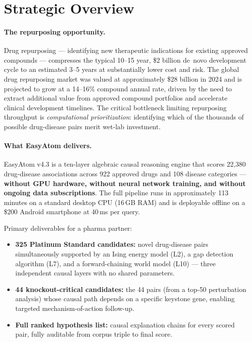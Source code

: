 \documentclass[11pt]{article}
\begin{document}
\newpage

\section{Strategic Overview}
\label{sec:strategic}

\paragraph{The repurposing opportunity.}
Drug repurposing --- identifying new therapeutic indications for existing
approved compounds --- compresses the typical 10--15 year, \$2 billion
de~novo development cycle to an estimated 3--5 years at substantially
lower cost and risk.
The global drug repurposing market was valued at approximately \$28 billion
in 2024 and is projected to grow at a 14--16\% compound annual rate,
driven by the need to extract additional value from approved compound
portfolios and accelerate clinical development timelines.
The critical bottleneck limiting repurposing throughput is
\emph{computational prioritization}: identifying which of the thousands
of possible drug-disease pairs merit wet-lab investment.

\paragraph{What EasyAtom delivers.}
EasyAtom v4.3 is a ten-layer algebraic causal reasoning engine that
scores 22,380 drug-disease associations across 922 approved drugs and
108 disease categories ---
\textbf{without GPU hardware, without neural network training, and
without ongoing data subscriptions}.
The full pipeline runs in approximately 113 minutes on a standard desktop CPU
(16\,GB RAM) and is deployable offline on a \$200 Android smartphone at
40\,ms per query.

Primary deliverables for a pharma partner:
\begin{itemize}[noitemsep]
  \item \textbf{325 Platinum Standard candidates:} novel drug-disease pairs
    simultaneously supported by an Ising energy model (L2), a gap
    detection algorithm (L7), and a forward-chaining world model (L10) ---
    three independent causal layers with no shared parameters.
  \item \textbf{44 knockout-critical candidates:} the 44 pairs (from a
    top-50 perturbation analysis) whose causal path depends on a specific
    keystone gene, enabling targeted mechanism-of-action follow-up.
  \item \textbf{Full ranked hypothesis list:} causal explanation chains for
    every scored pair, fully auditable from corpus triple to final score.
\end{itemize}
\end{document}
